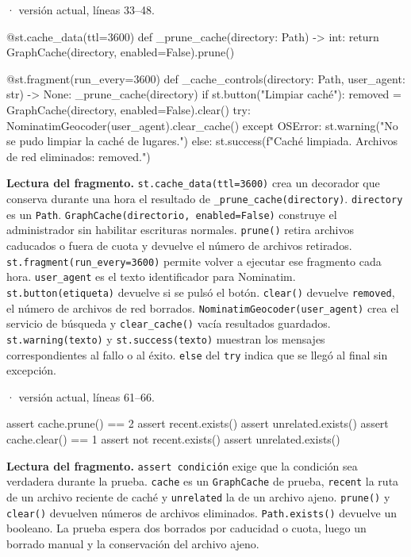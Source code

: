\documentclass[11pt,a4paper]{article}
\begin{document}
\smallskip
{\footnotesize\texttt{} · versión actual, líneas 33--48.}\par
\begin{Codigo}[firstnumber=33]
@st.cache_data(ttl=3600)
def _prune_cache(directory: Path) -> int:
    return GraphCache(directory, enabled=False).prune()


@st.fragment(run_every=3600)
def _cache_controls(directory: Path, user_agent: str) -> None:
    _prune_cache(directory)
    if st.button("Limpiar caché"):
        removed = GraphCache(directory, enabled=False).clear()
        try:
            NominatimGeocoder(user_agent).clear_cache()
        except OSError:
            st.warning("No se pudo limpiar la caché de lugares.")
        else:
            st.success(f"Caché limpiada. Archivos de red eliminados: {removed}.")
\end{Codigo}

\textbf{Lectura del fragmento.} \texttt{st.cache\_data(ttl=3600)} crea un decorador que conserva durante una hora el resultado de \texttt{\_prune\_cache(directory)}. \texttt{directory} es un \texttt{Path}. \texttt{GraphCache(directorio, enabled=False)} construye el administrador sin habilitar escrituras normales. \texttt{prune()} retira archivos caducados o fuera de cuota y devuelve el número de archivos retirados. \texttt{st.fragment(run\_every=3600)} permite volver a ejecutar ese fragmento cada hora. \texttt{user\_agent} es el texto identificador para Nominatim. \texttt{st.button(etiqueta)} devuelve si se pulsó el botón. \texttt{clear()} devuelve \texttt{removed}, el número de archivos de red borrados. \texttt{NominatimGeocoder(user\_agent)} crea el servicio de búsqueda y \texttt{clear\_cache()} vacía resultados guardados. \texttt{st.warning(texto)} y \texttt{st.success(texto)} muestran los mensajes correspondientes al fallo o al éxito. \texttt{else} del \texttt{try} indica que se llegó al final sin excepción.


\smallskip
{\footnotesize\texttt{} · versión actual, líneas 61--66.}\par
\begin{Codigo}[firstnumber=61]
    assert cache.prune() == 2
    assert recent.exists()
    assert unrelated.exists()
    assert cache.clear() == 1
    assert not recent.exists()
    assert unrelated.exists()
\end{Codigo}

\textbf{Lectura del fragmento.} \texttt{assert condición} exige que la condición sea verdadera durante la prueba. \texttt{cache} es un \texttt{GraphCache} de prueba, \texttt{recent} la ruta de un archivo reciente de caché y \texttt{unrelated} la de un archivo ajeno. \texttt{prune()} y \texttt{clear()} devuelven números de archivos eliminados. \texttt{Path.exists()} devuelve un booleano. La prueba espera dos borrados por caducidad o cuota, luego un borrado manual y la conservación del archivo ajeno.
\end{document}

